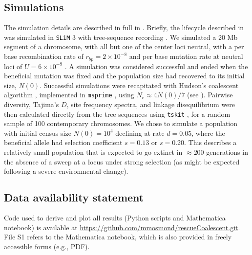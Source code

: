 \documentclass[]{article}
\begin{document}
\subsection*{Simulations}
\label{sec:simulations}

The simulation details are described in full in .
Briefly, the lifecycle described in  was simulated in \texttt{SLiM} 3 \citep{Haller2019slim} with tree-sequence recording \citep{Haller2019tree}.
We simulated a 20 Mb segment of a chromosome, with all but one of the center loci neutral, with a per base recombination rate of $r_{bp}=2\times10^{-8}$ and per base mutation rate at neutral loci of $U=6\times10^{-9}$ \citep[both inspired by \textit{Drosophila} estimates;][]{mackay2012drosophila,haag2007direct}.
A simulation was considered successful and ended when the beneficial mutation was fixed and the population size had recovered to its initial size, $N(0)$.
Successful simulations were recapitated with Hudson's coalescent algorithm \citep{hudson1983properties,hudson2002generating}, implemented in \texttt{msprime} \citep{kelleher2016efficient}, using $N_e\approx4 N(0)/7$ (see ).
Pairwise diversity, Tajima's $D$, site frequency spectra, and linkage disequilibrium were then calculated directly from the tree sequences using \texttt{tskit} \cite[][]{kelleher2018efficient}, for a random sample of 100 contemporary chromosomes. 
We chose to simulate a population with initial census size $N(0)=10^4$ declining at rate $d=0.05$, where the beneficial allele had selection coefficient $s=0.13$ or $s=0.20$.
This describes a relatively small population that is expected to go extinct in $\approx 200$ generations in the absence of a sweep at a locus under strong selection (as might be expected following a severe environmental change).

\subsection*{Data availability statement}
\label{sec:data}

Code used to derive and plot all results (Python scripts and Mathematica notebook) is available at \url{https://github.com/mmosmond/rescueCoalescent.git}.
File S1 refers to the Mathematica notebook, which is also provided in freely accessible forms (e.g., PDF).

\end{document}
